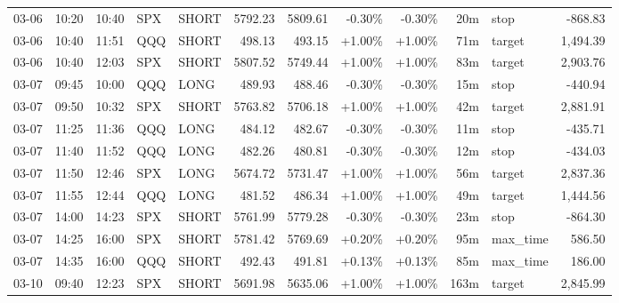 \documentclass[11pt,a4paper,twoside]{article}
\begin{document}
\begin{center}
\begin{longtable}{>{\color{txtmain}}l l l l l r r r r r >{\color{txtmain}}l r}
03-06 & 10:20 & 10:40 & SPX & SHORT & 5792.23 & 5809.61 & \textcolor{lossred}{-0.30\%} & \textcolor{lossred}{-0.30\%} & 20m & stop & \textcolor{lossred}{-868.83} \\
03-06 & 10:40 & 11:51 & QQQ & SHORT & 498.13 & 493.15 & \textcolor{wingreen}{+1.00\%} & \textcolor{wingreen}{+1.00\%} & 71m & target & \textcolor{wingreen}{1,494.39} \\
03-06 & 10:40 & 12:03 & SPX & SHORT & 5807.52 & 5749.44 & \textcolor{wingreen}{+1.00\%} & \textcolor{wingreen}{+1.00\%} & 83m & target & \textcolor{wingreen}{2,903.76} \\
03-07 & 09:45 & 10:00 & QQQ & LONG & 489.93 & 488.46 & \textcolor{lossred}{-0.30\%} & \textcolor{lossred}{-0.30\%} & 15m & stop & \textcolor{lossred}{-440.94} \\
03-07 & 09:50 & 10:32 & SPX & SHORT & 5763.82 & 5706.18 & \textcolor{wingreen}{+1.00\%} & \textcolor{wingreen}{+1.00\%} & 42m & target & \textcolor{wingreen}{2,881.91} \\
03-07 & 11:25 & 11:36 & QQQ & LONG & 484.12 & 482.67 & \textcolor{lossred}{-0.30\%} & \textcolor{lossred}{-0.30\%} & 11m & stop & \textcolor{lossred}{-435.71} \\
03-07 & 11:40 & 11:52 & QQQ & LONG & 482.26 & 480.81 & \textcolor{lossred}{-0.30\%} & \textcolor{lossred}{-0.30\%} & 12m & stop & \textcolor{lossred}{-434.03} \\
03-07 & 11:50 & 12:46 & SPX & LONG & 5674.72 & 5731.47 & \textcolor{wingreen}{+1.00\%} & \textcolor{wingreen}{+1.00\%} & 56m & target & \textcolor{wingreen}{2,837.36} \\
03-07 & 11:55 & 12:44 & QQQ & LONG & 481.52 & 486.34 & \textcolor{wingreen}{+1.00\%} & \textcolor{wingreen}{+1.00\%} & 49m & target & \textcolor{wingreen}{1,444.56} \\
03-07 & 14:00 & 14:23 & SPX & SHORT & 5761.99 & 5779.28 & \textcolor{lossred}{-0.30\%} & \textcolor{lossred}{-0.30\%} & 23m & stop & \textcolor{lossred}{-864.30} \\
03-07 & 14:25 & 16:00 & SPX & SHORT & 5781.42 & 5769.69 & \textcolor{wingreen}{+0.20\%} & \textcolor{wingreen}{+0.20\%} & 95m & max\_time & \textcolor{wingreen}{586.50} \\
03-07 & 14:35 & 16:00 & QQQ & SHORT & 492.43 & 491.81 & \textcolor{wingreen}{+0.13\%} & \textcolor{wingreen}{+0.13\%} & 85m & max\_time & \textcolor{wingreen}{186.00} \\
03-10 & 09:40 & 12:23 & SPX & SHORT & 5691.98 & 5635.06 & \textcolor{wingreen}{+1.00\%} & \textcolor{wingreen}{+1.00\%} & 163m & target & \textcolor{wingreen}{2,845.99} \\

\end{longtable}
\end{center}
\end{document}
